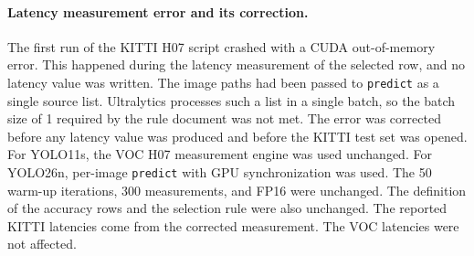 \paragraph{Latency measurement error and its correction.}
The first run of the KITTI H07 script crashed with a CUDA out-of-memory error. This happened during the latency measurement of the selected row, and no latency value was written. The image paths had been passed to \texttt{predict} as a single source list. Ultralytics processes such a list in a single batch, so the batch size of 1 required by the rule document was not met. The error was corrected before any latency value was produced and before the KITTI test set was opened. For YOLO11s, the VOC H07 measurement engine was used unchanged. For YOLO26n, per-image \texttt{predict} with GPU synchronization was used. The 50 warm-up iterations, 300 measurements, and FP16 were unchanged. The definition of the accuracy rows and the selection rule were also unchanged. The reported KITTI latencies come from the corrected measurement. The VOC latencies were not affected.

\FloatBarrier
